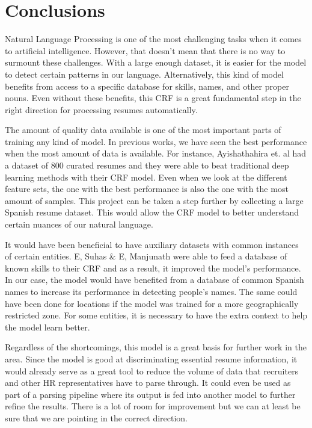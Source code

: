 
\chapter{Conclusions} %

\label{Cap7} %


  Natural Language Processing is one of the most challenging tasks when it
  comes to artificial intelligence. However, that doesn't mean that there is no
  way to surmount these challenges. With a large enough dataset, it is easier
  for the model to detect certain patterns in our language. Alternatively, this
  kind of model benefits from access to a specific database for skills, names,
  and other proper nouns. Even without these benefits, this CRF is a great
  fundamental step in the right direction for processing resumes automatically. 

  The amount of quality data available is one of the most important parts of
  training any kind of model. In previous works, we have seen the best
  performance when the most amount of data is available. For instance,
  Ayishathahira et. al \cite{Ayishathahira2018a} had a dataset of 800 curated
  resumes and they were able to beat traditional deep learning methods with
  their CRF model. Even when we look at the different feature sets, the one
  with the best performance is also the one with the most amount of samples.
  This project can be taken a step further by collecting a large Spanish resume
  dataset. This would allow the CRF model to better understand certain nuances
  of our natural language.

  It would have been beneficial to have auxiliary datasets with common
  instances of certain entities. E, Suhas & E, Manjunath \cite{E*2020} were
  able to feed a database of known skills to their CRF and as a result, it
  improved the model's performance. In our case, the model would have benefited
  from a database of common Spanish names to increase its performance in
  detecting people's names. The same could have been done for locations if the
  model was trained for a more geographically restricted zone. For some
  entities, it is necessary to have the extra context to help the model learn
  better.

  Regardless of the shortcomings, this model is a great basis for further work
  in the area. Since the model is good at discriminating essential resume
  information, it would already serve as a great tool to reduce the volume of
  data that recruiters and other HR representatives have to parse through. It
  could even be used as part of a parsing pipeline where its output is fed into
  another model to further refine the results. There is a lot of room for
  improvement but we can at least be sure that we are pointing in the correct
  direction.

